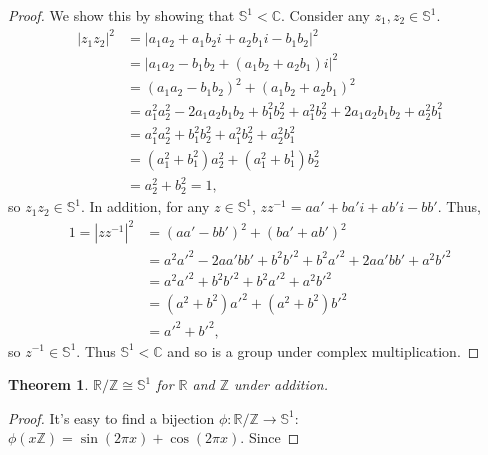 \documentclass{amsart}
\newtheorem{thm}{Theorem}
\newcommand{\inv}{^{-1}}
\newcommand{\Z}{\mathbb{Z}}
\newcommand{\R}{\mathbb{R}}
\newcommand{\C}{\mathbb{C}}
\newcommand{\cg}{\mathbb{S}^1}
\newcommand{\iso}{\cong}
\begin{document}
\begin{proof}
  We show this by showing that $\cg < \C$.
  Consider any $z_1, z_2 \in \cg$.
  \begin{align*}
    |z_1z_2|^2
    &= |a_1a_2 + a_1b_2i + a_2b_1i - b_1b_2|^2\\
    &= |a_1a_2 - b_1b_2 + (a_1b_2 + a_2b_1)i|^2\\
    &= (a_1a_2 - b_1b_2)^2 + (a_1b_2 + a_2b_1)^2\\
    &= a_1^2a_2^2 - 2a_1a_2b_1b_2 + b_1^2b_2^2 + a_1^2b_2^2 + 2a_1a_2b_1b_2 + a_2^2b_1^2\\
    &= a_1^2a_2^2 + b_1^2b_2^2 + a_1^2b_2^2 + a_2^2b_1^2\\
    &= (a_1^2 + b_1^2)a_2^2 + (a_1^2 + b_1^1)b_2^2\\
    &= a_2^2 + b_2^2 = 1,
  \end{align*}
  so $z_1z_2 \in \cg$.
  In addition, for any $z \in \cg$, $zz\inv = aa' + ba' i + ab' i - bb'$.
  Thus,
  \begin{align*}
    1 = |zz\inv|^2
    &= (aa' - bb')^2 + (ba' + ab')^2\\
    &= a^2a'^2 - 2aa'bb' + b^2b'^2 + b^2a'^2 + 2aa'bb' + a^2b'^2\\
    &= a^2a'^2 + b^2b'^2 + b^2a'^2 + a^2b'^2\\
    &= (a^2 + b^2)a'^2 + (a^2 + b^2)b'^2\\
    &= a'^2 + b'^2,
  \end{align*}
  so $z\inv \in \cg$.
  Thus $\cg < \C$ and so is a group under complex multiplication.
\end{proof}

\begin{thm}
  $\R/\Z \iso \cg$ for $\R$ and $\Z$ under addition.
\end{thm}

\begin{proof}
  It's easy to find a bijection $\phi : \R/\Z \to \cg$:
  $\phi(x\Z) = \sin(2\pi x) + \cos(2\pi x)$.
  Since 
\end{proof}
\end{document}
